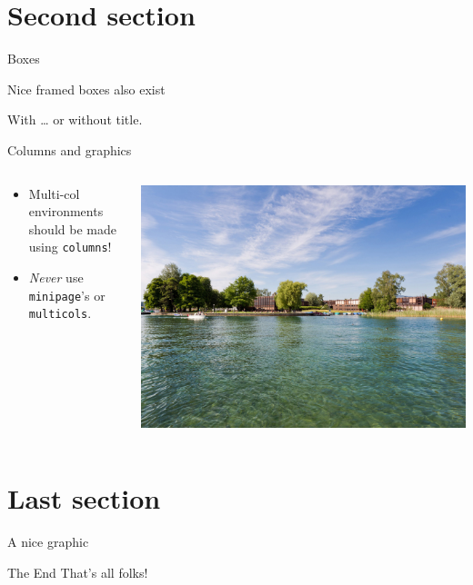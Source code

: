 \documentclass[aspectratio=43]{beamer}    %
\begin{document}
\section{Second section}
\begin{frame}{Boxes}
    \begin{HSRBox}{}
        Nice framed boxes also exist
    \end{HSRBox}
    \begin{HSRBox}{With \dots}
        or without title.
    \end{HSRBox}
\end{frame}
\begin{frame}{Columns and graphics}
    \begin{columns}[onlytextwidth]
        \begin{column}{0.5\textwidth}
            \begin{itemize}
                \item Multi-col environments should be made using \texttt{columns}!
                \item \emph{Never} use \texttt{minipage}'s or \texttt{multicols}.
            \end{itemize}
        \end{column}
        \begin{column}{0.5\textwidth}
            \centering
            \includegraphics[width=0.8\linewidth]{backgrounds/Titelbild_Sommer.jpg}
        \end{column}
    \end{columns}
\end{frame}

\section{Last section}
\begin{frame}{A nice graphic}
    \centering
    
\end{frame}
\begin{frame}{The End}
    \centering
    \LARGE That's all folks!
\end{frame}
\end{document}
